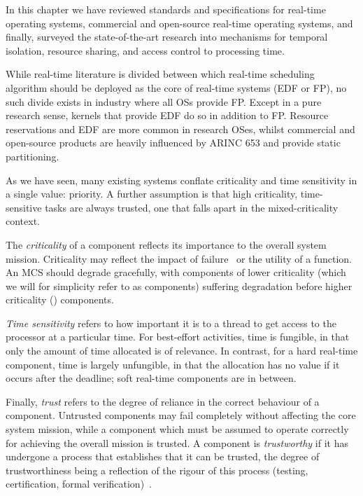 In this chapter we have reviewed standards and specifications for real-time operating systems,
commercial and open-source real-time operating systems, and finally, surveyed the state-of-the-art
research into mechanisms for temporal isolation, resource sharing, and access control to processing
time.

While real-time literature is divided between which real-time scheduling algorithm should be
deployed as the core of real-time systems (\gls{EDF} or \gls{FP}), no such divide exists in industry
where all \glspl{OS} provide \gls{FP}. 
Except in a pure research sense, kernels that provide
\gls{EDF} do so in addition to \gls{FP}.  Resource reservations and \gls{EDF} are more common in
research OSes, whilst commercial and open-source products are heavily influenced by ARINC 653 and
provide static partitioning. 
 
As we have seen, many existing systems conflate criticality and time sensitivity 
in a single value: priority. A further assumption is that high criticality, time-sensitive tasks are
always trusted, one that falls apart in the mixed-criticality context. 

The \emph{criticality} of a component reflects its importance to the
overall system mission.
Criticality may reflect the impact of failure~\citep{ARINC653} or the
utility of a function. An MCS should degrade gracefully, with
components of lower criticality (which we will for simplicity refer to
as  components) suffering degradation before higher
criticality () components.

\emph{Time sensitivity} refers to how important it is to a thread to
get access to the processor at a particular time. For best-effort activities, time is
fungible, in that only the amount of time allocated is of
relevance. In contrast, for a hard real-time component, time is
largely unfungible, in that the allocation has no value if it occurs after
the deadline; soft real-time components are in between.

Finally, \emph{trust} refers to the degree of reliance in the correct
behaviour of a component. Untrusted components may fail completely
without affecting the core system mission, while a component which
must be assumed to operate correctly for achieving the overall mission
is trusted. A component is \emph{trustworthy} if it has undergone a process
that establishes that it can be trusted, the degree of trustworthiness
being a reflection of the rigour of this process (testing,
certification, formal verification)~\citep{Verissimo_NC_03}.

